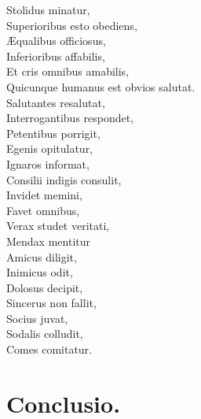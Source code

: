 \documentclass[12pt, twocolumn]{memoir}
\begin{document}
Stolidus minatur,\\
Superioribus esto obediens,\\
Æqualibus officiosus,\\
Inferioribus affabilis,\\
Et cris omnibus amabilis,\\
Quicunque humanus est obvios salutat.\\
Salutantes resalutat,\\
Interrogantibus respondet,\\
Petentibus porrigit,\\
Egenis opitulatur,\\
Ignaros informat,\\
Consilii indigis consulit,\\
Invidet memini,\\
Favet omnibus,\\
Verax studet veritati,\\
Mendax mentitur\\
Amicus diligit,\\
Inimicus odit,\\
Dolosus decipit,\\
Sincerus non fallit,\\
Socius juvat,\\
Sodalis colludit,\\
Comes comitatur.\\

\chapter{Conclusio.}
\end{document}
